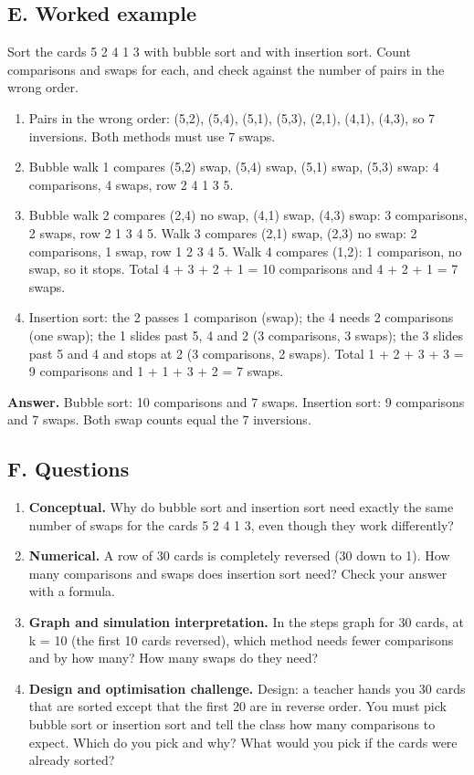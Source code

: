 \documentclass[11pt,a4paper]{article}
\begin{document}
\subsection*{E. Worked example}
Sort the cards 5 2 4 1 3 with bubble sort and with insertion sort. Count comparisons and swaps for each, and check against the number of pairs in the wrong order.
\begin{enumerate}[nosep]
\item Pairs in the wrong order: (5,2), (5,4), (5,1), (5,3), (2,1), (4,1), (4,3), so 7 inversions. Both methods must use 7 swaps.
\item Bubble walk 1 compares (5,2) swap, (5,4) swap, (5,1) swap, (5,3) swap: 4 comparisons, 4 swaps, row 2 4 1 3 5.
\item Bubble walk 2 compares (2,4) no swap, (4,1) swap, (4,3) swap: 3 comparisons, 2 swaps, row 2 1 3 4 5. Walk 3 compares (2,1) swap, (2,3) no swap: 2 comparisons, 1 swap, row 1 2 3 4 5. Walk 4 compares (1,2): 1 comparison, no swap, so it stops. Total 4 + 3 + 2 + 1 = 10 comparisons and 4 + 2 + 1 = 7 swaps.
\item Insertion sort: the 2 passes 1 comparison (swap); the 4 needs 2 comparisons (one swap); the 1 slides past 5, 4 and 2 (3 comparisons, 3 swaps); the 3 slides past 5 and 4 and stops at 2 (3 comparisons, 2 swaps). Total 1 + 2 + 3 + 3 = 9 comparisons and 1 + 1 + 3 + 2 = 7 swaps.
\end{enumerate}
\textbf{Answer.} Bubble sort: 10 comparisons and 7 swaps. Insertion sort: 9 comparisons and 7 swaps. Both swap counts equal the 7 inversions.

\subsection*{F. Questions}
\begin{enumerate}[nosep]
\item \textbf{Conceptual.} Why do bubble sort and insertion sort need exactly the same number of swaps for the cards 5 2 4 1 3, even though they work differently?
\item \textbf{Numerical.} A row of 30 cards is completely reversed (30 down to 1). How many comparisons and swaps does insertion sort need? Check your answer with a formula.
\item \textbf{Graph and simulation interpretation.} In the steps graph for 30 cards, at k = 10 (the first 10 cards reversed), which method needs fewer comparisons and by how many? How many swaps do they need?
\item \textbf{Design and optimisation challenge.} Design: a teacher hands you 30 cards that are sorted except that the first 20 are in reverse order. You must pick bubble sort or insertion sort and tell the class how many comparisons to expect. Which do you pick and why? What would you pick if the cards were already sorted?
\end{enumerate}
\end{document}
